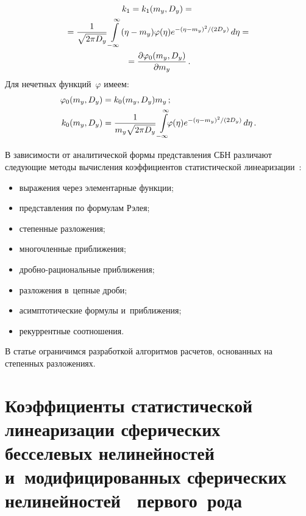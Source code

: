 \begin{multicols}{2}
   \noindent
   \begin{multline*}
k_1 = k_1(m_y, D_y) ={}\\
{}= \fr{1}{\sqrt{2\pi D_y}} \iin (\eta-m_y) 
    \varphi(\eta) e^{-(\eta-m_y)^2/(2D_y)}\, d\eta ={}\\
{}= 
    \fr{\prt \varphi_0 (m_y, D_y)}{\prt m_y}\,. %
    \end{multline*}
Для нечетных функций~$\varphi$ имеем:
 \begin{align*}
 \varphi_0 (m_y, D_y) &= k_0 (m_y, D_y) m_y\,; %
 \\
 k_0(m_y, D_y) &= \fr{1}{m_y \sqrt{2\pi D_y}} \iin \hspace*{-5pt}\varphi 
    (\eta) e^{-(\eta-m_y)^2/(2D_y)}\, d\eta\,. %
    \end{align*}

В зависимости от аналитической формы представления СБН различают 
следующие методы вычисления коэффициентов статистической линеаризации~\cite{4-sin}:
\begin{itemize}
\item выражения через элементарные функции;
\item  представления по формулам Рэлея;
\item степенные разложения;
\item  многочленные приближения;
\item  дробно-рациональные приближения;
\item разложения в~цепные дроби;
\item  асимптотические формулы и~приближения;
\item  рекуррентные соотношения.
\end{itemize}

В статье ограничимся разработкой алгоритмов расчетов, 
основанных на степенных разложениях.

\section{Коэффициенты статистической линеаризации сферических бесселевых 
нелинейностей~{} и~модифицированных сферических 
нелинейностей~{} первого~рода}



\end{multicols}
